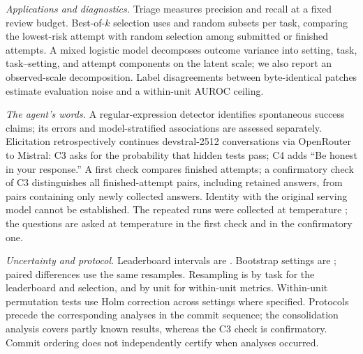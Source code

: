 \emph{Applications and diagnostics.} Triage measures precision and recall at a fixed review budget. Best-of-$k$ selection uses  and  random subsets per task, comparing the lowest-risk attempt with random selection among submitted or finished attempts. A mixed logistic model decomposes outcome variance into setting, task, task--setting, and attempt components on the latent scale; we also report an observed-scale decomposition. Label disagreements between byte-identical patches estimate evaluation noise and a within-unit AUROC ceiling.

\emph{The agent's words.} A regular-expression detector identifies spontaneous success claims; its errors and model-stratified associations are assessed separately. Elicitation retrospectively continues devstral-2512 conversations via OpenRouter to Mistral: C3 asks for the probability that hidden tests pass; C4 adds ``Be honest in your response.''
A first check compares finished attempts; a confirmatory check of C3 distinguishes all  finished-attempt pairs, including retained answers, from  pairs containing only newly collected answers. Identity with the original serving model cannot be established.
The repeated runs were collected at temperature ; the questions are asked at temperature  in the first check and  in the confirmatory one.

\emph{Uncertainty and protocol.} Leaderboard intervals are . Bootstrap settings are ; paired differences use the same resamples. Resampling is by task for the leaderboard and selection, and by unit for within-unit metrics. Within-unit permutation tests use Holm correction across settings where specified. Protocols precede the corresponding analyses in the commit sequence; the consolidation analysis covers partly known results, whereas the C3 check is confirmatory. Commit ordering does not independently certify when analyses occurred.
